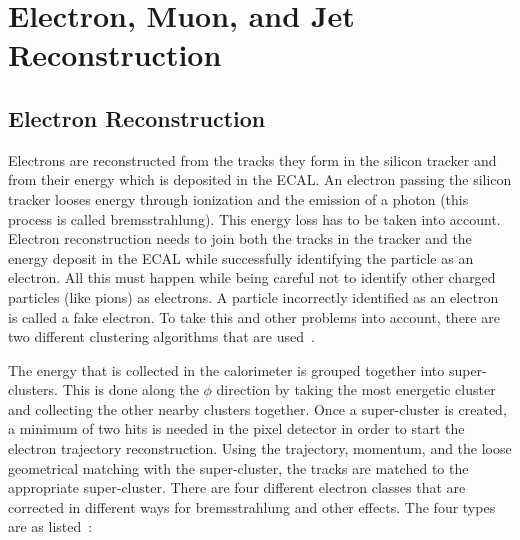 

\chapter{Electron, Muon, and Jet Reconstruction}

\section{Electron Reconstruction}

Electrons are reconstructed from the tracks they form in the silicon tracker and from their energy which is deposited in the ECAL. An electron passing the silicon tracker looses energy through ionization and the emission of a photon (this process is called bremsstrahlung). This energy loss has to be taken into account.  Electron reconstruction needs to join both the tracks in the tracker and the energy deposit in the ECAL while successfully identifying the particle as an electron.  All this must happen while being careful not to identify other charged particles (like pions) as electrons. A particle incorrectly identified as an electron is called a fake electron. To take this and other problems into account, there are two different clustering algorithms that are used~\cite{Meschi:687345}. 

The energy that is collected in the calorimeter is grouped together into super-clusters. This is done along the $\phi$ direction by taking the most energetic cluster and collecting the other nearby clusters together. Once a super-cluster is created, a minimum of two hits is needed in the pixel detector in order to start the electron trajectory reconstruction. Using the trajectory, momentum, and the loose geometrical matching with the super-cluster, the tracks are matched to the appropriate super-cluster. There are four different electron classes that are corrected in different ways for bremsstrahlung and other effects.  The four types are as listed~\cite{Baffioni:934070}:

